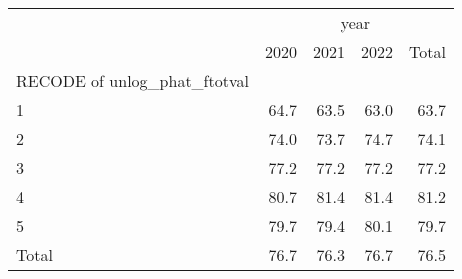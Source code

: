 \begin{tabular}{lllll}
\cline{1-5}
\multicolumn{1}{c}{} &
  \multicolumn{4}{|c}{year} \\
\multicolumn{1}{c}{} &
  \multicolumn{1}{|r}{2020} &
  \multicolumn{1}{r}{2021} &
  \multicolumn{1}{r}{2022} &
  \multicolumn{1}{r}{Total} \\
\cline{1-5}
\multicolumn{1}{l}{RECODE of unlog\_phat\_ftotval} &
  \multicolumn{1}{|r}{} &
  \multicolumn{1}{r}{} &
  \multicolumn{1}{r}{} &
  \multicolumn{1}{r}{} \\
\multicolumn{1}{l}{\hspace{1em}1} &
  \multicolumn{1}{|r}{64.7} &
  \multicolumn{1}{r}{63.5} &
  \multicolumn{1}{r}{63.0} &
  \multicolumn{1}{r}{63.7} \\
\multicolumn{1}{l}{\hspace{1em}2} &
  \multicolumn{1}{|r}{74.0} &
  \multicolumn{1}{r}{73.7} &
  \multicolumn{1}{r}{74.7} &
  \multicolumn{1}{r}{74.1} \\
\multicolumn{1}{l}{\hspace{1em}3} &
  \multicolumn{1}{|r}{77.2} &
  \multicolumn{1}{r}{77.2} &
  \multicolumn{1}{r}{77.2} &
  \multicolumn{1}{r}{77.2} \\
\multicolumn{1}{l}{\hspace{1em}4} &
  \multicolumn{1}{|r}{80.7} &
  \multicolumn{1}{r}{81.4} &
  \multicolumn{1}{r}{81.4} &
  \multicolumn{1}{r}{81.2} \\
\multicolumn{1}{l}{\hspace{1em}5} &
  \multicolumn{1}{|r}{79.7} &
  \multicolumn{1}{r}{79.4} &
  \multicolumn{1}{r}{80.1} &
  \multicolumn{1}{r}{79.7} \\
\multicolumn{1}{l}{\hspace{1em}Total} &
  \multicolumn{1}{|r}{76.7} &
  \multicolumn{1}{r}{76.3} &
  \multicolumn{1}{r}{76.7} &
  \multicolumn{1}{r}{76.5} \\
\cline{1-5}
\end{tabular}
